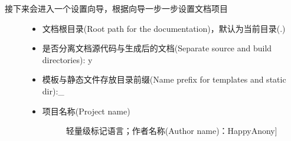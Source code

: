 \documentclass[a4paper,10pt,english]{sphinxmanual}
\begin{document}
\begin{figure}[htbp]
\centering

\noindent{}
\end{figure}
\begin{description}
\item[{接下来会进入一个设置向导，根据向导一步一步设置文档项目}] \leavevmode\begin{itemize}
\item {} \begin{description}
\item[{文档根目录(Root path for the documentation)，默认为当前目录(.)}] \leavevmode
\begin{figure}[htbp]
\centering

\noindent{}
\end{figure}

\end{description}

\item {} \begin{description}
\item[{是否分离文档源代码与生成后的文档(Separate source and build directories): y}] \leavevmode
\begin{figure}[htbp]
\centering

\noindent{}
\end{figure}

\end{description}

\item {} \begin{description}
\item[{模板与静态文件存放目录前缀(Name prefix for templates and static dir):\_}] \leavevmode
\begin{figure}[htbp]
\centering

\noindent{}
\end{figure}

\end{description}

\item {} \begin{description}
\item[{项目名称(Project name)}] \leavevmode{[}轻量级标记语言；作者名称(Author name)：HappyAnony{]}
\begin{figure}[htbp]
\centering

\noindent{}
\end{figure}


\end{description}
\end{itemize}
\end{description}
\end{document}
